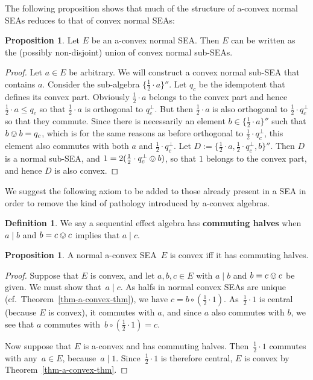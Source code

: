 \documentclass[a4paper, onecolumn, accepted=2020-12-22]{quantumarticle}
\newcommand\Define[1]{\textbf{#1}}
\newcommand{\mult}{\mathop{\circ}}
\newcommand{\commu}{\mathrel{\lvert}}
\newcounter{counter}
\theoremstyle{definition}
\newtheorem{proposition}[counter]{Proposition}
\newtheorem{definition}[counter]{Definition}
\begin{document}
The following proposition shows that much of the structure of a-convex normal SEAs reduces to that of convex normal SEAs:

\begin{proposition}
	Let $E$ be an a-convex normal SEA. Then $E$ can be written as the (possibly non-disjoint) union of convex normal sub-SEAs.
\end{proposition}
\begin{proof}
	Let $a\in E$ be arbitrary. We will construct a convex normal sub-SEA that contains $a$.
	Consider the sub-algebra $\{\frac12\cdot a\}''$. Let $q_c$ be the idempotent that defines its convex part. Obviously $\frac12\cdot a$ belongs to the convex part and hence $\frac12\cdot a\leq q_c$ so that $\frac12\cdot a$ is orthogonal to $q_c^\perp$. 
	But then $\frac12\cdot a$ is also orthogonal to $\frac12\cdot q_c^\perp$ so that they commute. 
	Since there is necessarily an element $b\in \{\frac12\cdot a\}''$ such that $b\ovee b = q_c$, which is for the same reasons as before orthogonal to $\frac12\cdot q_c^\perp$, this element also commutes with both $a$ and $\frac12\cdot q_c^\perp$. 
	Let $D := \{\frac12\cdot a, \frac12\cdot q_c^\perp, b\}''$. Then $D$ is a normal sub-SEA, and $1=2(\frac12\cdot q_c^\perp \ovee b)$, so that $1$ belongs to the convex part, and hence $D$ is also convex.
\end{proof}

We suggest the following axiom to be added to those already present in a SEA in order to remove the kind of pathology introduced by a-convex algebras.

\begin{definition}
    We say a sequential effect algebra has \Define{commuting halves} when $a\commu b$ and $b=c\ovee c$ implies that $a\commu c$.
\end{definition}

\begin{proposition}\label{prop:a-convexcommutewithhalves}
A normal a-convex SEA~$E$ is convex iff it has commuting halves.
\end{proposition}
\begin{proof}
Suppose that $E$ is convex,
and let $a,b,c \in E$ with $a\commu b$ and $b=c\ovee c$
be given.
We must show that~$a \commu c$.
As halfs in normal convex SEAs are unique (cf.~Theorem~\ref{thm-a-convex-thm}), we have
 $c = b\mult(\frac{1}{2} \cdot 1)$.
As~$\frac{1}{2}\cdot 1$ is central (because $E$ is convex), it commutes with $a$, and since $a$ also commutes with $b$, we see that $a$ commutes with~$b\mult(\frac12 \cdot 1) = c$.

Now suppose that $E$ is a-convex 
and has commuting halves. 
Then~$\frac{1}{2}\cdot 1$ commutes with any~$a\in E$,
because~$a\commu 1$.
  Since~$\frac{1}{2}\cdot 1$ is therefore central,
  $E$ is convex by Theorem~\ref{thm-a-convex-thm}.
\end{proof}
\end{document}
